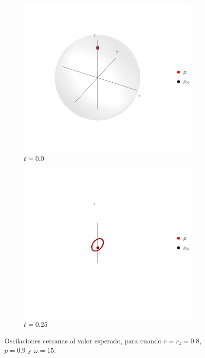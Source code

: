 \begin{figure}[ht!]
    \centering
    \begin{subfigure}{0.5\textwidth}
      \centering
      \includegraphics[width=0.9\linewidth]{chapter3/figures_separable/U1xU2_H1=(sz)_H2=15(sx-sy)_z=0.8_p=0.9_far.png}
      \caption{$t=0.0$}
    \end{subfigure}%
    \begin{subfigure}{0.5\textwidth}
      \centering
      \includegraphics[width=0.9\linewidth]{chapter3/figures_separable/U1xU2_H1=(sz)_H2=15(sx-sy)_z=0.8_p=0.9.png}
      \caption{$t=0.25$}
    \end{subfigure}
    \caption{Oscilaciones cercanas al valor esperado, para cuando $r=r_{z}=0.8$, $p=0.9$ y $\omega=15$. }\label{fig:EvolutionOscilations}
\end{figure}

